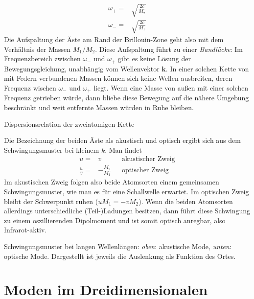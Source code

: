 \begin{align}
\omega_+ = & \sqrt{\frac{2 c}{M_2}} \\
\omega_- = & \sqrt{\frac{2 c}{M_1} }
\end{align}
Die Aufspaltung der Äste am Rand der Brillouin-Zone geht also mit dem Verhältnis der Massen $M_1 / M_2$. Diese Aufspaltung führt zu einer \emph{Bandlücke}: Im Frequenzbereich zwischen $\omega_- $ und $\omega_+$ gibt es keine Lösung der Bewegungsgleichung, unabhängig vom Wellenvektor $\mathbf{k}$. In einer solchen Kette von mit Federn verbundenen Massen können sich keine Wellen ausbreiten, deren Frequenz wischen $\omega_- $ und $\omega_+$ liegt. Wenn eine Masse von außen mit einer solchen Frequenz getrieben würde, dann bliebe diese Bewegung auf die nähere Umgebung beschränkt und weit entfernte Massen würden in Ruhe bleiben.




\begin{marginfigure}

\caption{Dispersionsrelation der zweiatomigen Kette}
\end{marginfigure}

Die Bezeichnung der beiden Äste als akustisch und optisch ergibt sich aus dem Schwingungsmuster bei kleinem $k$. Man findet
\begin{align}
 u = &v &&  \text{akustischer Zweig} \\
  \frac{u}{v} = &- \frac{M_2}{M_1} &&  \text{optischer Zweig} 
\end{align}
Im akustischen Zweig folgen also beide Atomsorten einem gemeinsamen Schwingungsmuster, wie man es für eine Schallwelle erwartet. Im optischen Zweig bleibt der Schwerpunkt ruhen ($u M_1 = - v M_2$). Wenn die beiden Atomsorten allerdings unterschiedliche (Teil-)Ladungen besitzen, dann führt diese Schwingung zu einem oszillierenden Dipolmoment und ist somit optisch anregbar, also Infrarot-aktiv.


\begin{marginfigure}
\caption{Schwingungsmuster bei langen Wellenlängen: \textit{oben}: akustische Mode, \textit{unten}: optische Mode. Dargestellt ist jeweils die Auslenkung als Funktion des Ortes.}
\end{marginfigure}





\section{Moden im Dreidimensionalen}

